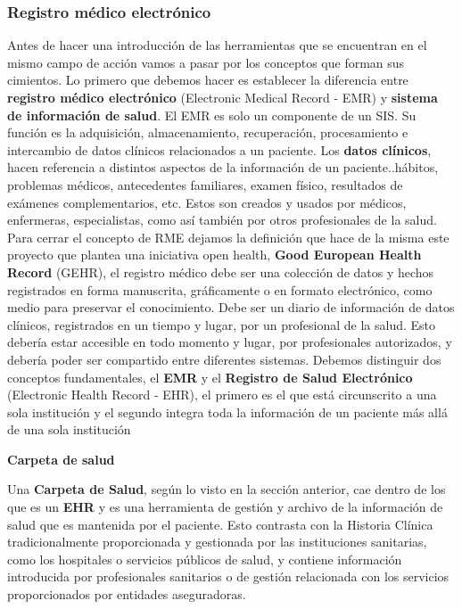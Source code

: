 \subsubsection{Registro médico electrónico}
	Antes de hacer una introducción de las herramientas que se encuentran en el mismo campo de acción vamos a pasar por los conceptos que forman sus cimientos.
Lo primero que debemos hacer es establecer la diferencia entre \textbf{registro médico electrónico} (Electronic Medical Record - EMR) y \textbf{sistema de información de salud}. El EMR es solo un componente de un SIS. Su función es la adquisición, almacenamiento, recuperación, procesamiento e intercambio de datos clínicos relacionados a un paciente. Los \textbf{datos clínicos}, hacen referencia a distintos aspectos de la información de un paciente..hábitos, problemas médicos, antecedentes familiares, examen físico, resultados de exámenes complementarios, etc. Estos son creados y usados por médicos, enfermeras, especialistas, como así también por otros profesionales de la salud. Para cerrar el concepto de RME dejamos la definición que hace de la misma este proyecto que plantea una iniciativa open health, \textbf{Good European Health Record} (GEHR), el registro médico debe ser una colección de datos y hechos registrados en forma manuscrita, gráficamente o en formato electrónico, como medio para preservar el conocimiento. Debe ser un diario de información de datos clínicos, registrados en un tiempo y lugar, por un profesional de la salud. Esto debería estar accesible en todo momento y lugar, por profesionales autorizados, y debería poder ser compartido entre diferentes sistemas. Debemos distinguir dos conceptos fundamentales, el \textbf{EMR} y el \textbf{Registro de Salud Electrónico} (Electronic Health Record - EHR), el primero es el que está circunscrito a una sola institución y el segundo integra toda la información de un paciente más allá de una sola institución

\textbf{Carpeta de salud}

Una \textbf{Carpeta de Salud}, según lo visto en la sección anterior, cae dentro de los que es un \textbf{EHR} y es una herramienta de gestión y archivo de la información de salud que es mantenida por el paciente.
Esto contrasta con la Historia Clínica tradicionalmente proporcionada y gestionada por las instituciones sanitarias,
como los hospitales o servicios públicos de salud,
y contiene información introducida por profesionales sanitarios o de gestión relacionada con los servicios proporcionados por entidades aseguradoras.

